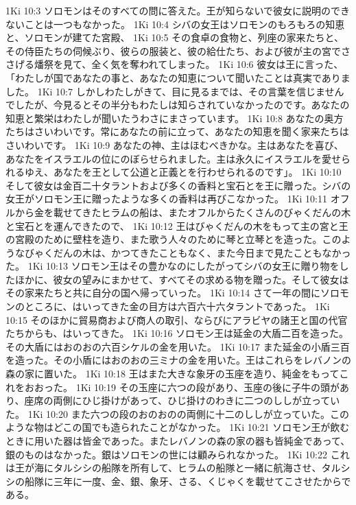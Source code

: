 1Ki 10:3  ソロモンはそのすべての問に答えた。王が知らないで彼女に説明のできないことは一つもなかった。
1Ki 10:4  シバの女王はソロモンのもろもろの知恵と、ソロモンが建てた宮殿、
1Ki 10:5  その食卓の食物と、列座の家来たちと、その侍臣たちの伺候ぶり、彼らの服装と、彼の給仕たち、および彼が主の宮でささげる燔祭を見て、全く気を奪われてしまった。
1Ki 10:6  彼女は王に言った、「わたしが国であなたの事と、あなたの知恵について聞いたことは真実でありました。
1Ki 10:7  しかしわたしがきて、目に見るまでは、その言葉を信じませんでしたが、今見るとその半分もわたしは知らされていなかったのです。あなたの知恵と繁栄はわたしが聞いたうわさにまさっています。
1Ki 10:8  あなたの奥方たちはさいわいです。常にあなたの前に立って、あなたの知恵を聞く家来たちはさいわいです。
1Ki 10:9  あなたの神、主はほむべきかな。主はあなたを喜び、あなたをイスラエルの位にのぼらせられました。主は永久にイスラエルを愛せられるゆえ、あなたを王として公道と正義とを行わせられるのです」。
1Ki 10:10  そして彼女は金百二十タラントおよび多くの香料と宝石とを王に贈った。シバの女王がソロモン王に贈ったような多くの香料は再びこなかった。
1Ki 10:11  オフルから金を載せてきたヒラムの船は、またオフルからたくさんのびゃくだんの木と宝石とを運んできたので、
1Ki 10:12  王はびゃくだんの木をもって主の宮と王の宮殿のために壁柱を造り、また歌う人々のために琴と立琴とを造った。このようなびゃくだんの木は、かつてきたこともなく、また今日まで見たこともなかった。
1Ki 10:13  ソロモン王はその豊かなのにしたがってシバの女王に贈り物をしたほかに、彼女の望みにまかせて、すべてその求める物を贈った。そして彼女はその家来たちと共に自分の国へ帰っていった。
1Ki 10:14  さて一年の間にソロモンのところに、はいってきた金の目方は六百六十六タラントであった。
1Ki 10:15  そのほかに貿易商および商人の取引、ならびにアラビヤの諸王と国の代官たちからも、はいってきた。
1Ki 10:16  ソロモン王は延金の大盾二百を造った。その大盾にはおのおの六百シケルの金を用いた。
1Ki 10:17  また延金の小盾三百を造った。その小盾にはおのおの三ミナの金を用いた。王はこれらをレバノンの森の家に置いた。
1Ki 10:18  王はまた大きな象牙の玉座を造り、純金をもってこれをおおった。
1Ki 10:19  その玉座に六つの段があり、玉座の後に子牛の頭があり、座席の両側にひじ掛けがあって、ひじ掛けのわきに二つのししが立っていた。
1Ki 10:20  また六つの段のおのおのの両側に十二のししが立っていた。このような物はどこの国でも造られたことがなかった。
1Ki 10:21  ソロモン王が飲むときに用いた器は皆金であった。またレバノンの森の家の器も皆純金であって、銀のものはなかった。銀はソロモンの世には顧みられなかった。
1Ki 10:22  これは王が海にタルシシの船隊を所有して、ヒラムの船隊と一緒に航海させ、タルシシの船隊に三年に一度、金、銀、象牙、さる、くじゃくを載せてこさせたからである。
